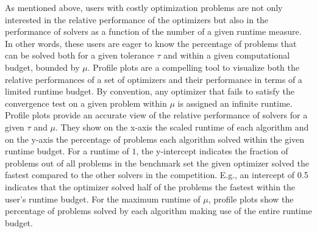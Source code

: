 \noindent As mentioned above, users with costly optimization problems are not only interested in the relative performance of the optimizers but also in the performance of solvers as a function of the number of a given runtime measure. In other words, these users are eager to know the percentage of problems that can be solved both for a given tolerance $\tau$ and within a given computational budget, bounded by $\mu$. Profile plots are a compelling tool to visualize both the relative performances of a set of optimizers and their performance in terms of a limited runtime budget. By convention, any optimizer that fails to satisfy the convergence test on a given problem within $\mu$ is assigned an infinite runtime.
Profile plots provide an accurate view of the relative performance of solvers for a given $\tau$ and $\mu$. They show on the x-axis the scaled runtime of each algorithm and on the y-axis the percentage of problems each algorithm solved within the given runtime budget. For a runtime of $1$, the y-intercept indicates the fraction of problems out of all problems in the benchmark set the given optimizer solved the fastest compared to the other solvers in the competition.
E.g., an intercept of 0.5 indicates that the optimizer solved half of the problems the fastest within the user's runtime budget. For the maximum runtime of $\mu$, profile plots show the percentage of problems solved by each algorithm making use of the entire runtime budget.






